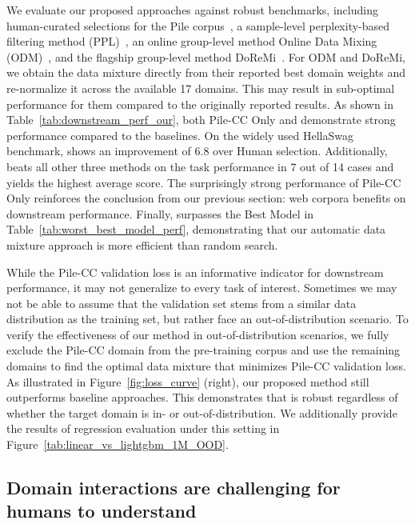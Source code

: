 We evaluate our proposed approaches against robust benchmarks, including human-curated selections for the Pile corpus~\citep{the_pile_corpus}, a sample-level perplexity-based filtering method (PPL)~\citep{zachary2024perplexed}, an online group-level method Online Data Mixing (ODM)~\citep{albalak2023efficient}, and the flagship group-level method DoReMi~\citep{xie2023doremi}. 
For ODM and DoReMi, we obtain the data mixture directly from their reported best domain weights and re-normalize it across the available 17 domains. This may result in sub-optimal performance for them compared to the originally reported results. As shown in Table~\ref{tab:downstream_perf_our}, both Pile-CC Only and \ourmethod demonstrate strong performance compared to the baselines. On the widely used HellaSwag benchmark, \ourmethod shows an improvement of $6.8$ over Human selection. Additionally, \ourmethod beats all other three methods on the task performance in 7 out of 14 cases and yields the highest average score. The surprisingly strong performance of Pile-CC Only reinforces the conclusion from our previous section: web corpora benefits on downstream performance. Finally, \ourmethod surpasses the Best Model in Table~\ref{tab:worst_best_model_perf}, demonstrating that our automatic data mixture approach is more efficient than random search.





While the Pile-CC validation loss is an informative indicator for downstream performance, it may not generalize to every task of interest. Sometimes we may not be able to assume that the validation set stems from a similar data distribution as the training set, but rather face an out-of-distribution scenario.
To verify the effectiveness of our method in out-of-distribution scenarios, we fully exclude the Pile-CC domain from the pre-training corpus and use the remaining domains to find the optimal data mixture that minimizes Pile-CC validation loss. As illustrated in Figure~\ref{fig:loss_curve} (right), our proposed method still outperforms baseline approaches. This demonstrates that \ourmethod is robust regardless of whether the target domain is in- or out-of-distribution.
We additionally provide the results of regression evaluation under this setting in Figure~\ref{tab:linear_vs_lightgbm_1M_OOD}.

\subsection{Domain interactions are challenging for humans to understand}\label{sec:domain_interaction}


